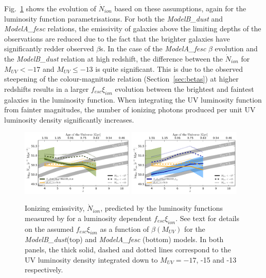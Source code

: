 Fig.~\ref{fig:Nion_xi_kappa_zMuv} shows the evolution of $\dot{N}_{ion}$ based on these assumptions, again for the \citet{Bouwens:2014tx} luminosity function parametrisations. For both the \emph{ModelB\_dust} and \emph{ModelA\_fesc} relations, the emissivity of galaxies above the limiting depths of the observations are reduced due to the fact that the brighter galaxies have significantly redder observed $\beta$s. In the case of the \emph{ModelA\_fesc} $\beta$ evolution and the \emph{ModelB\_dust} relation at high redshift, the difference between the $\dot{N}_{ion}$ for $M_{UV} < -17$ and $M_{UV} \leq -13$ is quite significant. This is due to the observed steepening of the colour-magnitude relation (Section~\ref{sec:betas}) at higher redshifts results in a larger $f_{esc}\xi_{ion}$ evolution between the brightest and faintest galaxies in the luminosity function. When integrating the UV luminosity function from fainter magnitudes, the number of ionizing photons produced per unit UV luminosity density significantly increases.

\begin{figure}
  \includegraphics[width=0.48\textwidth]{plots/Fig10a.pdf}
  \includegraphics[width=0.48\textwidth]{plots/Fig10b.pdf}
  \caption{Ionizing emissivity, $\dot{N}_{ion}$, predicted by the luminosity functions measured by \citet{Bouwens:2014tx} for a luminosity dependent $f_{esc}\xi_{ion}$. See text for details on the assumed $f_{esc}\xi_{ion}$ as a function of $\beta(M_{UV})$ for the \emph{ModelB\_dust}(top) and \emph{ModelA\_fesc} (bottom) models. In both panels, the thick solid, dashed and dotted lines correspond to the UV luminosity density integrated down to $M_{UV} = -17$, -15 and -13 respectively.}
  \label{fig:Nion_xi_kappa_zMuv}
\end{figure}

